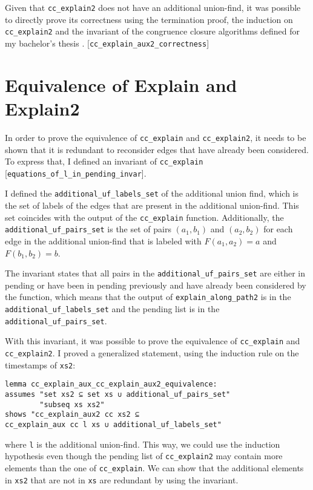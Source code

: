 Given that \lstinline|cc_explain2| does not have an additional union-find, it was possible to directly prove its correctness using the termination proof, the induction on \lstinline|cc_explain2| and the invariant of the congruence closure algorithms defined for my bachelor's thesis \cite{rebi}. [\lstinline|cc_explain_aux2_correctness|]

\section{Equivalence of Explain and Explain2}

In order to prove the equivalence of \lstinline|cc_explain| and \lstinline|cc_explain2|, it needs to be shown that it is redundant to reconsider edges that have already been considered.
To express that, I defined an invariant of \lstinline|cc_explain| [\lstinline|equations_of_l_in_pending_invar|].

I defined the \lstinline|additional_uf_labels_set| of the additional union find, which is the set of labels of the edges that are present in the additional union-find. This set coincides with the output of the \lstinline|cc_explain| function. Additionally, the \lstinline|additional_uf_pairs_set| is the set of pairs $(a_1, b_1)$ and $(a_2, b_2)$ for each edge in the additional union-find that is labeled with $F(a_1, a_2) = a$ and $F(b_1, b_2) = b$.

The invariant states that all pairs in the \lstinline|additional_uf_pairs_set| are either in pending or have been in pending previously and have already been considered by the function, which means that the output of \lstinline|explain_along_path2| is in the \lstinline|additional_uf_labels_set| and the pending list is in the \lstinline|additional_uf_pairs_set|.

With this invariant, it was possible to prove the equivalence of \lstinline|cc_explain| and \lstinline|cc_explain2|. I proved a generalized statement, using the induction rule on the timestamps of \lstinline|xs2|:

\begin{lstlisting}
lemma cc_explain_aux_cc_explain_aux2_equivalence:
assumes "set xs2 ⊆ set xs ∪ additional_uf_pairs_set"
        "subseq xs xs2"
shows "cc_explain_aux2 cc xs2 ⊆
cc_explain_aux cc l xs ∪ additional_uf_labels_set"
\end{lstlisting}

where \lstinline|l| is the additional union-find. This way, we could use the induction hypothesis even though the pending list of \lstinline|cc_explain2| may contain more elements than the one of \lstinline|cc_explain|. We can show that the additional elements in \lstinline|xs2| that are not in \lstinline|xs| are redundant by using the invariant.
